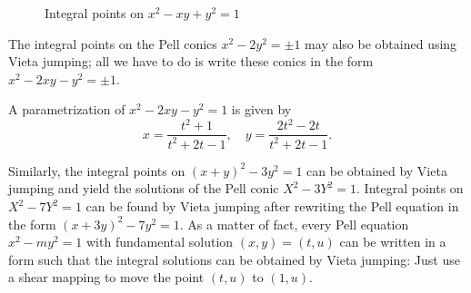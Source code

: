 \documentclass{amsart}
\begin{document}
\begin{figure}[ht!]
  \begin{center}
  \end{center}
  \caption{Integral points on $x^2 - xy + y^2 = 1$}\label{AEll}
\end{figure}





The integral points on the Pell conics $x^2 - 2y^2 = \pm 1$ may also be
obtained using Vieta jumping; all we have to do is write these conics
in the form $x^2 - 2xy - y^2 = \pm 1$.

A parametrization of $x^2 - 2xy - y^2 = 1$ is given by
$$ x = \frac{t^2+1}{t^2+2t-1}, \quad
   y = \frac{2t^2-2t}{t^2+2t-1}. $$

Similarly, the integral points on $(x+y)^2 - 3y^2 = 1$ can be obtained
by Vieta jumping and yield the solutions of the Pell conic $X^2 - 3Y^2 = 1$.   
Integral points on $X^2 - 7Y^2 = 1$ can be found by Vieta jumping after
rewriting the Pell equation in the form $(x+3y)^2 - 7y^2 = 1$.
As a matter of fact, every Pell equation $x^2 - my^2 = 1$ 
with fundamental solution $(x,y) = (t,u)$ can be written in a form
such that the integral solutions can be obtained by Vieta jumping:
Just use a shear mapping to move the point $(t,u)$ to $(1,u)$.
\end{document}
